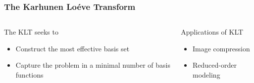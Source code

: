 \documentclass[fleqn]{beamer}
\begin{document}
  \begin{frame}
      \frametitle{The Karhunen Lo\'{e}ve Transform}
      \begin{columns}[T]
          \begin{column}{0.5\textwidth}
              \begin{block}{The KLT seeks to}
                  \begin{itemize}
                      \item Construct the most effective basis set
                      \item Capture the problem in a minimal number of basis 
                      functions
                  \end{itemize}
                  
              \end{block}
          \end{column}
          \begin{column}{0.5\textwidth}
              \begin{block}{Applications of KLT}
                  \begin{itemize}
                      \item Image compression
                      \item Reduced-order modeling
                  \end{itemize}
              \end{block}
          \end{column}
      \end{columns}
  \end{frame}
\end{document}
